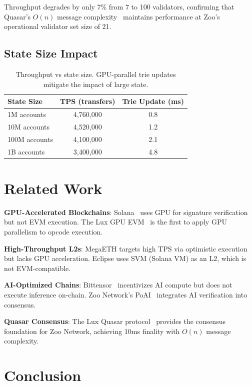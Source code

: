 \documentclass[11pt,letterpaper]{article}
\begin{document}
Throughput degrades by only 7\% from 7 to 100 validators, confirming that Quasar's $O(n)$ message complexity~\cite{lux-quasar-benchmarks} maintains performance at Zoo's operational validator set size of 21.

\subsection{State Size Impact}

\begin{table}[t]
\centering
\begin{tabular}{lcc}
\toprule
\textbf{State Size} & \textbf{TPS (transfers)} & \textbf{Trie Update (ms)} \\
\midrule
1M accounts & 4,760,000 & 0.8 \\
10M accounts & 4,520,000 & 1.2 \\
100M accounts & 4,100,000 & 2.1 \\
1B accounts & 3,400,000 & 4.8 \\
\bottomrule
\end{tabular}
\caption{Throughput vs state size. GPU-parallel trie updates mitigate the impact of large state.}
\label{tab:state}
\end{table}

\section{Related Work}

\textbf{GPU-Accelerated Blockchains}: Solana~\cite{yakovenko2018solana} uses GPU for signature verification but not EVM execution. The Lux GPU EVM~\cite{lux-evmgpu-benchmark} is the first to apply GPU parallelism to opcode execution.

\textbf{High-Throughput L2s}: MegaETH targets high TPS via optimistic execution but lacks GPU acceleration. Eclipse uses SVM (Solana VM) as an L2, which is not EVM-compatible.

\textbf{AI-Optimized Chains}: Bittensor~\cite{bittensor2023} incentivizes AI compute but does not execute inference on-chain. Zoo Network's PoAI~\cite{zoo-poai-consensus} integrates AI verification into consensus.

\textbf{Quasar Consensus}: The Lux Quasar protocol~\cite{lux-quasar-consensus,lux-quasar-benchmarks} provides the consensus foundation for Zoo Network, achieving 10ms finality with $O(n)$ message complexity.

\section{Conclusion}
\end{document}
